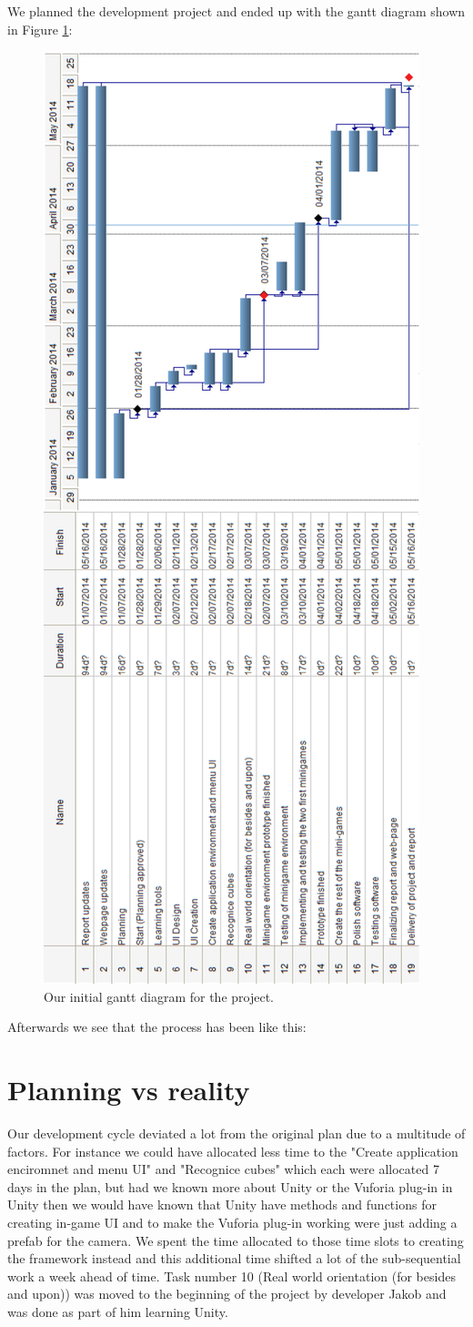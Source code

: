 We planned the development project and ended up with the gantt diagram shown in Figure \ref{fig:preplan_gantt}:

\begin{figure}[h]
	\capstart
	\centering
	\includegraphics[height=\textwidth, angle=270]{preplan_gantt_diagram}
	\caption[Preplan Gantt diagram]{Our initial gantt diagram for the project.}	\label{fig:preplan_gantt}
\end{figure}


Afterwards we see that the process has been like this:


\section{Planning vs reality}%
Our development cycle deviated a lot from the original plan due to a multitude of factors.
For instance we could have allocated less time to the "Create application enciromnet and menu UI" and "Recognice cubes" which each were allocated 7 days in the plan, but had we known more about Unity or the Vuforia plug-in in Unity then we would have known that Unity have methods and functions for creating in-game UI and to make the Vuforia plug-in working were just adding a \gls{prefab} for the camera.
We spent the time allocated to those time slots to creating the framework instead and this additional time shifted a lot of the sub-sequential work a week ahead of time.
Task number 10 (Real world orientation (for besides and upon)) was moved to the beginning of the project by developer Jakob and was done as part of him learning Unity.

